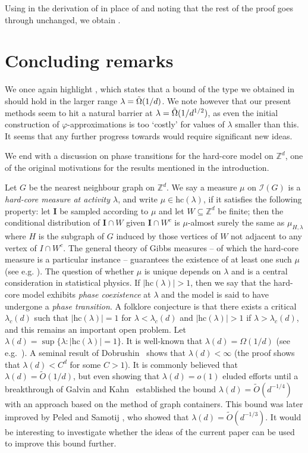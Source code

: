 \documentclass[a4paper]{amsart}
\theoremstyle{definition}
\newcommand{\Z}{\mathbb{Z}}
\newcommand{\0}[0]{\emptyset}
\newcommand{\lam}{\lambda}
\begin{document}
Using  in the derivation of \cite[Theorem 2]{jenssen2023approximately} in place of \cite[Lemma 20]{jenssen2023approximately} and noting that the rest of the proof goes through unchanged, we obtain .

\section{Concluding remarks}\label{conclusion}
We once again highlight  , which states that a bound of the type we obtained in  should hold in the larger range $\lam=\Tilde{\Omega}(1/d)$. We note however that our present methods seem to hit a natural barrier at $\lam=\Tilde{\Omega}(1/d^{1/2})$, as even the initial construction of $\varphi$-approximations is too `costly' for values of $\lam$ smaller than this. It seems that any further progress towards  would require significant new ideas.

We end with a discussion on phase transitions for the hard-core model on $\Z^d$, one of the original motivations for the results mentioned in the introduction. 

Let $G$ be the nearest neighbour graph on $\mathbb Z^d$. We say a measure $\mu$ on $\mathcal{I}(G)$ is a \emph{hard-core measure at activity $\lam$}, and write $\mu\in \text{hc}(\lam)$, if it satisfies the following property: let $\mathbf I$ be sampled according to $\mu$ and let $W\subseteq \mathbb{Z}^d$ be finite; then the conditional distribution of $\mathbf I \cap W$ given $\mathbf I \cap W^c$ is $\mu$-almost surely the same as $\mu_{H,\lam}$ where $H$ is the subgraph of $G$ induced by those vertices of $W$ not adjacent to any vertex of $I \cap W^c$. The general theory of Gibbs measures -- of which the hard-core measure is a particular instance -- guarantees the existence of at least one such $\mu$ (see e.g. \cite{georgii2011gibbs}). The question of whether $\mu$ is unique depends on $\lambda$ and is a central consideration in statistical physics. If $|\text{hc}(\lam)|>1$, then we say that the hard-core model exhibits \emph{phase coexistence} at $\lambda$ and the model is said to have undergone a \emph{phase transition}. A folklore conjecture is that there exists a critical $\lam_c(d)$ such that $|\text{hc}(\lam)|=1$ for $\lam<\lam_c(d)$ and $|\text{hc}(\lam)|>1$ if $\lam>\lam_c(d)$, and this remains an important open problem. Let $\lam(d)=\sup\{\lam: |\text{hc}(\lam)|=1 \}$. It is well-known that $\lam(d)=\Omega(1/d)$ (see e.g.~\cite{vdBS}). A seminal result of Dobrushin~\cite{dobrushinhardcore} shows that $\lam(d)<\infty$ (the proof shows that $\lam(d)<C^d$ for some $C>1$). It is commonly believed that $\lam(d)=\tilde O(1/d)$, but even showing that $\lam(d)=o(1)$ eluded efforts until a breakthrough of Galvin and Kahn~\cite{GalK04} established the bound $\lam(d)=\tilde O(d^{-1/4})$ with an approach based on the method of graph containers. This bound was later improved by Peled and Samotij \cite{peledsamotij}, who showed that $\lam(d)=\tilde O(d^{-1/3})$. It would be interesting to investigate whether the ideas of the current paper can be used to improve this bound further. 
\end{document}
